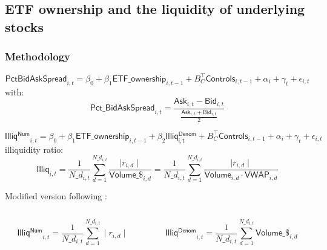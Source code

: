 \documentclass[9pt, usenames, dvipsnames]{beamer}
\begin{document}
\subsection{ETF ownership and the liquidity of underlying stocks}
\begin{frame}
  \frametitle{Methodology}
  \begin{equation}
 \mathsf{PctBidAskSpread}_{i,t} = \beta_{0} + \beta_{1} \mathsf{ETF\_ownership}_{i, t - 1} + B_{C}^{\intercal} \mathsf{Controls}_{i, t - 1} + \alpha_{i} + \gamma_{t} + \epsilon_{i, t}
  \end{equation}
  with:
  \begin{equation*}
  \mathsf{Pct\_BidAskSpread}_{i, t} = \frac{\mathsf{Ask}_{i, t} - \mathsf{Bid}_{i, t}}{\frac{\mathsf{Ask}_{i, t} + \mathsf{Bid}_{i, t}}{2}}
\end{equation*}

  \begin{equation}
   \mathsf{Illiq^{Num}}_{i,t} = \beta_{0} + \beta_{1} \mathsf{ETF\_ownership}_{i, t - 1} + \beta_{2} \mathsf{Illiq^{Denom}_{i,t}} + B_{C}^{\intercal} \mathsf{Controls}_{i, t- 1} + \alpha_{i} + \gamma_{t} + \epsilon_{i, t}
\end{equation}
  \textcite{Amihud2002} illiquidity ratio:
  \begin{equation*}
    \mathsf{Illiq}_{i, t}  = \frac{1}{N\_d_{i, t}} \sum_{d = 1}^{N\_d_{i, t}} \frac{\mid r_{i, d} \mid}{\mathsf{Volume\_\$}_{i, d}} = \frac{1}{N\_d_{i, t}} \sum_{d = 1}^{N\_d_{i, t}} \frac{\mid r_{i, d} \mid}{\mathsf{Volume}_{i, d} \cdot \mathsf{VWAP}_{i, d}}
  \end{equation*}

  Modified version following \textcite{Israeli2017}:
  \begin{columns}
    \begin{column}{0.5\textwidth}
      \begin{equation*}
        \mathsf{Illiq^{Num}}_{i, t} = \frac{1}{N\_d_{i, t}} \sum_{d = 1}^{N\_d_{i, t}}\mid r_{i, d} \mid
        \end{equation*}
    \end{column}
    \begin{column}{0.5\textwidth}
      \begin{equation*}
        \mathsf{Illiq^{Denom}}_{i, t} = \frac{1}{N\_d_{i, t}} \sum_{d = 1}^{N\_d_{i, t}} \mathsf{Volume\_\$}_{i, d}
        \end{equation*}
    \end{column}
  \end{columns}

\end{frame}
\end{document}
